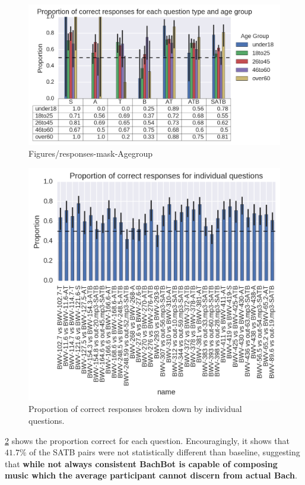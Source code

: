 \documentclass[dissertation.tex]{subfiles}
\begin{document}
\begin{figure}[htpb]
  \centering
  \includegraphics[width=1.0\textwidth]{Figures/responses-mask-agegroup.png}
  \caption{Figures/responses-mask-Agegroup}
  \label{fig:responses-mask-agegroup}
\end{figure}

\begin{figure}[htpb]
  \centering
  \includegraphics[width=0.8\linewidth]{Figures/responses-name.png}
  \caption{Proportion of correct responses broken down by individual questions.}
  \label{fig:responses-name}
\end{figure}

\cref{fig:responses-name} shows the proportion correct for each question.
Encouragingly, it shows that $41.7\%$ of the SATB pairs were not
statistically different than baseline, suggesting that \textbf{while not always
consistent BachBot is capable of composing music which the average participant
cannot discern from actual Bach}.
\end{document}

